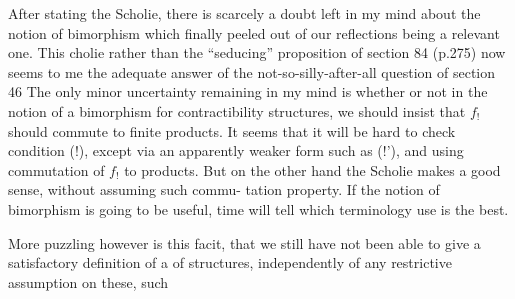 After stating the Scholie, there is scarcely a doubt left in my
mind about the notion of bimorphism which finally peeled out of our
reflections being a relevant one. This cholie\hand{,}  rather than
the ``seducing'' proposition of section 84 (p.275)\hand{,} now seems to me the
adequate answer of the not-so-silly-after-all question of section 46 
The only minor uncertainty remaining in my mind is whether or not in
the notion of a bimorphism for contractibility structures, we should
insist that $f_!$ should commute to finite products. It seems that it
will be hard to check condition (!), except via an apparently weaker
form such as (!'), and using commutation of $f_!$ to products. But on the
other hand the Scholie makes a good sense, without assuming such commu-%
tation property. If the notion of  bimorphism is going to be useful,
time  will tell which terminology use is the best.

More puzzling  however is this facit, that we still have not
been able to give a satisfactory definition of a \hand{\uline{\textcolor{black}{morphism}}} of \hand{\uline{\textcolor{black}{asphericity}}}
structures, independently of any restrictive assumption on these, such

